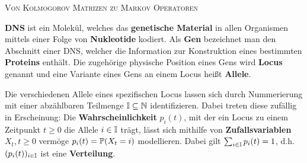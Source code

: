 \documentclass[a4paper]{paper}
\numberwithin{equation}{satz}
\begin{document}
\begin{center}
\large\textsc{Von Kolmogorov Matrizen zu Markov Operatoren}
\end{center}
\begin{bem}
\textbf{DNS} ist ein Molekül, welches das \textbf{genetische Material} in allen Organismen mittels einer Folge von \textbf{Nukleotide} kodiert. Als \textbf{Gen} bezeichnet man den Abschnitt einer DNS, welcher die Information zur Konstruktion eines bestimmten \textbf{Proteins} enthält. Die zugehörige physische Position eines Gens  wird \textbf{Locus} genannt und eine Variante eines Gens an einem Locus heißt  \textbf{Allele}.

\par Die verschiedenen Allele eines spezifischen Locus lassen sich durch Nummerierung mit einer abzählbaren Teilmenge $\mathbb I\subseteq \N$ identifizieren. Dabei treten diese zufällig in  Erscheinung: Die \textbf{Wahrscheinlichkeit} $p_i(t)$, mit der ein  Locus zu einem Zeitpunkt $t\geq 0$ die Allele $i\in\I$ trägt, lässt sich mithilfe von   \textbf{Zufallsvariablen} $X_t, t\geq0$ vermöge $p_i(t)=\P(X_t=i)$ modellieren. Dabei gilt $\sum_{i\in\I}p_i(t)=1$, d.h. $(p_i(t))_{i\in\I}$ ist eine \textbf{Verteilung}.
\begin{comment}
  \par \textbf{(Gen-)Drift} ist die Veränderung der relativen Häufigkeit der  Allele innerhalb des Genpools einer Population. Gendrift führt zu einer Abnahme der Variabilität des Genpools, da mit jeder Generation nur eine endliche Auswahl aller Allele eines Genpools zufällig an Nachkommen weitergegeben werden kann. Existiert schließlich nur noch eine Variante eines Gens, so spricht man von der \textbf{Fixierung} der Population hinsichtlich dieser Allele.
  
  \par  Als \textbf{Mutation} bezeichnen wir die zufällige Abänderung einer Nukleotidfolge an einem Locus, welche zu einer Variante des Gens führt. Falls hierbei eine neue Allele entsteht, die zuvor nicht im Genpool auftrat, so vermag Mutation genetischem Drift entgegenzuwirken, indem die Allele an Nachkommen weitergegeben wird.
\end{comment}



\end{bem}
\end{document}
